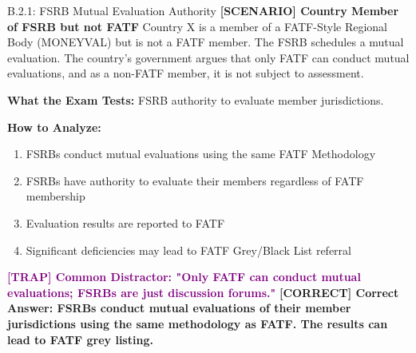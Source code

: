 \documentclass[11pt,a4paper]{beamer}
\newcommand{\trap}[1]{\textcolor{purple}{\textbf{[TRAP] #1}}}
\newcommand{\correct}[1]{\textcolor{green!50!black}{\textbf{[CORRECT] #1}}}
\newcommand{\scenario}[1]{\textcolor{blue!70!black}{\textbf{[SCENARIO] #1}}}
\begin{document}
	\begin{frame}{B.2.1: FSRB Mutual Evaluation Authority}
		\scenario{Country Member of FSRB but not FATF}
		Country X is a member of a FATF-Style Regional Body (MONEYVAL) but is not a FATF member. The FSRB schedules a mutual evaluation. The country's government argues that only FATF can conduct mutual evaluations, and as a non-FATF member, it is not subject to assessment.
		
		\vspace{0.1cm}
		\textbf{What the Exam Tests:} FSRB authority to evaluate member jurisdictions.
		
		\vspace{0.1cm}
		\textbf{How to Analyze:}
		\begin{enumerate}
			\item FSRBs conduct mutual evaluations using the same FATF Methodology
			\item FSRBs have authority to evaluate their members regardless of FATF membership
			\item Evaluation results are reported to FATF
			\item Significant deficiencies may lead to FATF Grey/Black List referral
		\end{enumerate}
		
		\trap{Common Distractor: "Only FATF can conduct mutual evaluations; FSRBs are just discussion forums."}
		\correct{Correct Answer: FSRBs conduct mutual evaluations of their member jurisdictions using the same methodology as FATF. The results can lead to FATF grey listing.}
	\end{frame}
	
\end{document}
